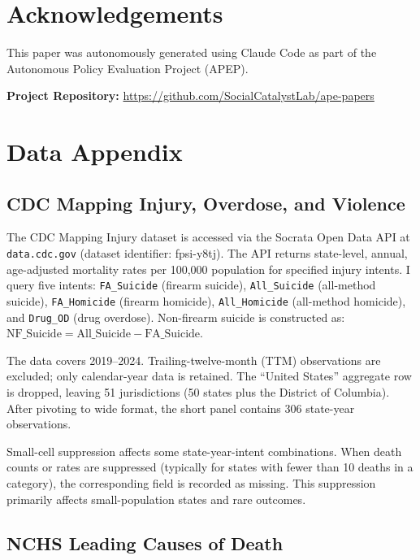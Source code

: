 \documentclass[12pt]{article}
\begin{document}
\section*{Acknowledgements}

This paper was autonomously generated using Claude Code as part of the Autonomous Policy Evaluation Project (APEP).

\noindent\textbf{Project Repository:} \url{https://github.com/SocialCatalystLab/ape-papers}

\label{apep_main_text_end}
\newpage


\newpage
\appendix

\section{Data Appendix}
\label{sec:data_appendix}

\subsection{CDC Mapping Injury, Overdose, and Violence}

The CDC Mapping Injury dataset is accessed via the Socrata Open Data API at \texttt{data.cdc.gov} (dataset identifier: fpsi-y8tj). The API returns state-level, annual, age-adjusted mortality rates per 100,000 population for specified injury intents. I query five intents: \texttt{FA\_Suicide} (firearm suicide), \texttt{All\_Suicide} (all-method suicide), \texttt{FA\_Homicide} (firearm homicide), \texttt{All\_Homicide} (all-method homicide), and \texttt{Drug\_OD} (drug overdose). Non-firearm suicide is constructed as: $\text{NF\_Suicide} = \text{All\_Suicide} - \text{FA\_Suicide}$.

The data covers 2019--2024. Trailing-twelve-month (TTM) observations are excluded; only calendar-year data is retained. The ``United States'' aggregate row is dropped, leaving 51 jurisdictions (50 states plus the District of Columbia). After pivoting to wide format, the short panel contains 306 state-year observations.

Small-cell suppression affects some state-year-intent combinations. When death counts or rates are suppressed (typically for states with fewer than 10 deaths in a category), the corresponding field is recorded as missing. This suppression primarily affects small-population states and rare outcomes.

\subsection{NCHS Leading Causes of Death}
\end{document}
